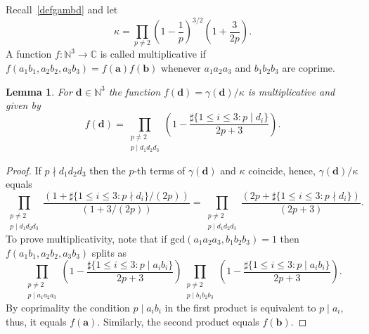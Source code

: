 \documentclass[a4paper,12pt,reqno]{amsart}
\numberwithin{equation}{section} \numberwithin{figure}{section}
\newcommand\N{\mathbb{N}}
\renewcommand{\l}{\left}
\renewcommand{\r}{\right}
\renewcommand{\b}{\mathbf}
\renewcommand{\gcd}{\textrm{gcd}}
\renewcommand{\leq}{\leqslant}
\renewcommand{\#}{\sharp}
\newtheorem{lemma}{Lemma}
\theoremstyle{definition}
\numberwithin{lemma}{section}
\begin{document}
Recall~\eqref{defgambd} and let $$\kappa =\prod_{p\neq 2 } 
 \l(1-\frac{1}{p} \r)^{3/2}
\l(1+  \frac{ 3  }{2 p} \r) .$$
A function $f:\N^3\to\mathbb C$ is called multiplicative if 
$
f(a_1b_1 , a_2b_2, a_3b_3 )
=f(\b a) f(\b b )
$ whenever $ a_1a_2a_3$ and $b_1b_2b_3$ are coprime.
 \begin{lemma} 
\label{lem:hock4ba3} For $\b d \in \N^3$
the  function $f(   \b d )= \gamma(\b d )/\kappa$ is    multiplicative and given by 
$$
f(\b d ) =
  \prod_{\substack{ p\neq 2 \\ p\mid d_1d_2d_3 } } 
\l(1-
\frac
{ \#\{1\leq i  \leq 3 : p\mid d_i \}  }
{ 2p +  3  }
\r) 
.$$ 
\end{lemma}
\begin{proof} 
 If $p\nmid d_1d_2d_3 $ then the $p$-th terms of $\gamma(\b d )$  and $\kappa$ coincide, hence, 
$\gamma(\b d )/\kappa$  equals  
\[
 \prod_{\substack{ p\neq 2 \\ p\mid d_1d_2d_3 } } 
\frac
{\l(1+  \#\{1\leq i  \leq 3 : p\nmid d_i \}/(2 p) \r)  
}
{\l(1+ 3/(2p) \r)  
} 
=
  \prod_{\substack{ p\neq 2 \\ p\mid d_1d_2d_3 } } 
\frac
{\l(2p +  \#\{1\leq i  \leq 3 : p\nmid d_i \}  \r)  
}
{\l(2p +  3 \r)  
}.
 \]
  To prove multiplicativity, 
 note that  if  $\gcd(a_1a_2a_3,b_1b_2b_3)=1$ then $f(a_1b_1, a_2b_2, a_3b_3 )$ splits as  
 \[  \prod_{\substack{ p\neq 2 \\ p\mid a_1a_2a_3   } } 
\l(1-
\frac
{ \#\{1\leq i  \leq 3 : p\mid a_ib_i \}  }
{ 2p +  3  }
\r)   \prod_{\substack{ p\neq 2 \\ p\mid   b_1 b_2 b_3 } } 
\l(1-
\frac
{ \#\{1\leq i  \leq 3 : p\mid a_ib_i \}  }
{ 2p +  3  }
\r) 
.\] 
By coprimality the condition $p\mid a_ib_i$ in the first product is equivalent to $p\mid a_i$, thus, it equals $f(\b a )$.
Similarly, the second product equals  
  $  f(\b b )$. 
\end{proof}
\end{document}
